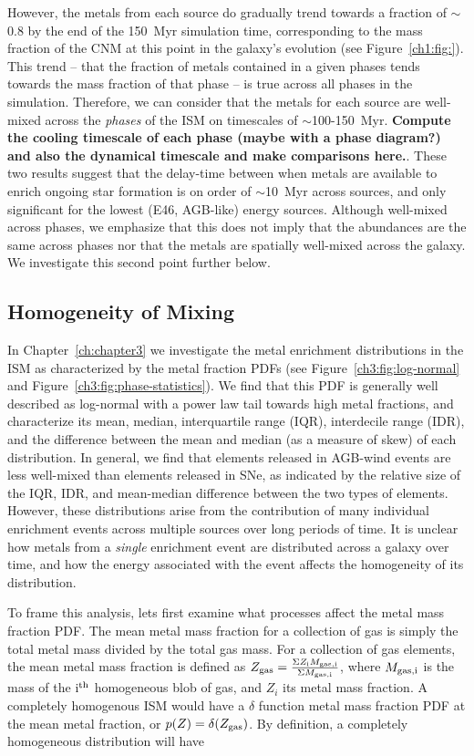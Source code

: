 However, the metals from each source do gradually trend towards a fraction of $\sim$0.8 by the end of the 150~Myr simulation time, corresponding to the mass fraction of the CNM at this point in the galaxy's evolution (see Figure~\ref{ch1:fig:}). This trend -- that the fraction of metals contained in a given phases tends towards the mass fraction of that phase -- is true across all phases in the simulation. Therefore, we can consider that the metals for each source are well-mixed across the \textit{phases} of the ISM on timescales of $\sim$100-150~Myr. \textbf{Compute the cooling timescale of each phase (maybe with a phase diagram?) and also the dynamical timescale and make comparisons here.}. These two results suggest that the delay-time between when metals are available to enrich ongoing star formation is on order of $\sim$10~Myr across sources, and only significant for the lowest (E46, AGB-like) energy sources. Although well-mixed across phases, we emphasize that this does not imply that the abundances are the same across phases nor that the metals are spatially well-mixed across the galaxy. We investigate this second point further below.


\subsection{Homogeneity of Mixing}
\label{ch4:sec:spreads}

In Chapter~\ref{ch:chapter3} we investigate the metal enrichment distributions in the ISM as characterized by the metal fraction PDFs (see Figure~\ref{ch3:fig:log-normal} and Figure~\ref{ch3:fig:phase-statistics}). We find that this PDF is generally well described as log-normal with a power law tail towards high metal fractions, and characterize its mean, median, interquartile range (IQR), interdecile range (IDR), and the difference between the mean and median (as a measure of skew) of each distribution. In general, we find that elements released in AGB-wind events are less well-mixed than elements released in SNe, as indicated by the relative size of the IQR, IDR, and mean-median difference between the two types of elements. However, these distributions arise from the contribution of many individual enrichment events across multiple sources over long periods of time. It is unclear how metals from a \textit{single} enrichment event are distributed across a galaxy over time, and how the energy associated with the event affects the homogeneity of its distribution.

To frame this analysis, lets first examine what processes affect the metal mass fraction PDF. The mean metal mass fraction for a collection of gas is simply the total metal mass divided by the total gas mass. For a collection of gas elements, the mean metal mass fraction is defined as $Z_{\rm gas} = \frac{ \Sigma Z_{\rm i}M_{\rm gas,i}}{\Sigma M_{\rm gas,i}}$, where $M_{\rm gas,i}$ is the mass of the i$^{\rm th}$ homogeneous blob of gas, and $Z_{i}$ its metal mass fraction. A completely homogenous ISM would have a $\delta$ function metal mass fraction PDF at the mean metal fraction, or $p(Z) = \delta(Z_{\rm gas})$. By definition, a completely homogeneous distribution will have 


\setcounter{section}{0}%
\renewcommand\thesection{\thechapter.\Alph{section}}

%
%

\renewcommand\thesection{\thechapter.\arabic{section}}
